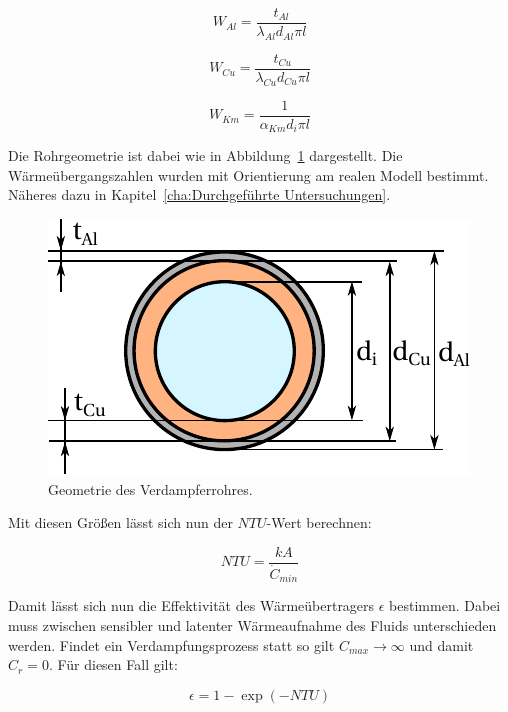 \begin{equation}
\label{eq:29}
W_{Al} = \frac{t_{Al}}{\lambda_{Al} d_{Al} \pi l}
\end{equation}

\begin{equation}
\label{eq:30}
W_{Cu} = \frac{t_{Cu}}{\lambda_{Cu} d_{Cu} \pi l}
\end{equation}

\begin{equation}
\label{eq:31}
W_{Km} = \frac{1}{\alpha_{Km} d_{i} \pi l}
\end{equation}

Die Rohrgeometrie ist dabei wie in Abbildung~\ref{fig:Geometrie} dargestellt.
Die Wärmeübergangszahlen wurden mit Orientierung am realen Modell bestimmt. Näheres dazu in Kapitel~\ref{cha:Durchgeführte Untersuchungen}.

\begin{figure}[h]
\centering
\includegraphics[scale=1]{Pictures/Rohrgeometrie.pdf}
\caption{Geometrie des Verdampferrohres.}
\label{fig:Geometrie}
\end{figure}

Mit diesen Größen lässt sich nun der $NTU$-Wert berechnen:

\begin{equation}
\label{eq:32}
NTU = \frac{kA}{\dot{C}_{min}}
\end{equation}

Damit lässt sich nun die Effektivität des Wärmeübertragers $\epsilon$ bestimmen.
Dabei muss zwischen sensibler und latenter Wärmeaufnahme des Fluids unterschieden werden.
Findet ein Verdampfungsprozess statt so gilt $C_{max}\longrightarrow\infty$ und damit $C_r =0$. Für diesen Fall gilt:

\begin{equation}
\label{eq:33}
\epsilon = 1- \exp{(-NTU)}
\end{equation}

